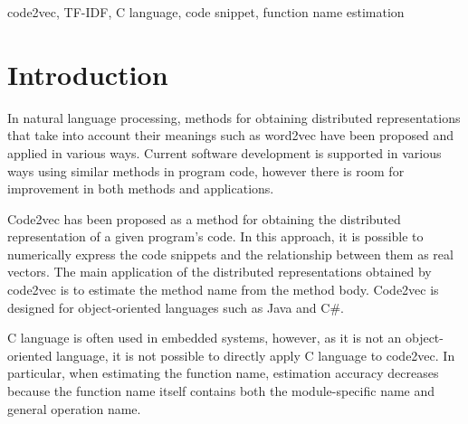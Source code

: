 \documentclass[JIP]{apris}
\begin{document}
\begin{keyword}
code2vec, TF-IDF, C language, code snippet, function name estimation
\end{keyword}

\maketitle

\section{Introduction}
In natural language processing, methods for obtaining distributed representations that take into account their meanings such as word2vec\cite{rong2014word2vec} have been proposed and applied in various ways. Current software development is supported in various ways using similar methods in program code, however there is room for improvement in both methods and applications. 

Code2vec\cite{alon2019code2vec} has been proposed as a method for obtaining the distributed representation of a given program’s code. In this approach, it is possible to numerically express the code snippets and the relationship between them as real vectors. The main application of the distributed representations obtained by code2vec is to estimate the method name from the method body. Code2vec is designed for object-oriented languages such as Java and C\#. 

C language is often used in embedded systems, however, as it is not an object-oriented language, it is not possible to directly apply C language to code2vec. In particular, when estimating the function name, estimation accuracy decreases because the function name itself contains both the module-specific name and general operation name.
\end{document}
